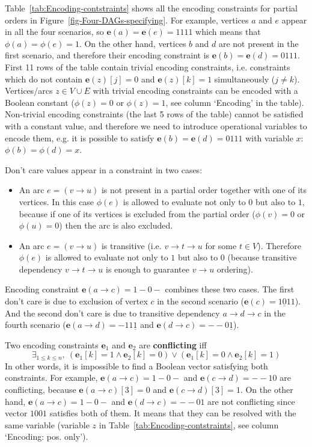 Table~\ref{tab:Encoding-contstraints} shows all the encoding constraints
for partial orders in Figure~\ref{fig-Four-DAGs-specifying}. For
example, vertices $a$ and $e$ appear in all the four scenarios,
so $\mathbf{e}(a)=\mathbf{e}(e)=1111$ which means that $\phi(a)=\phi(e)=1$.
On the other hand, vertices $b$ and $d$ are not present in the first
scenario, and therefore their encoding constraint is $\mathbf{e}(b)=\mathbf{e}(d)=0111$.
First 11 rows of the table contain trivial\emph{ }encoding\emph{ }constraints,
i.e. constraints which do not contain $\mathbf{e}(z)[j]=0$ and $\mathbf{e}(z)[k]=1$
simultaneously ($j\neq k$). Vertices/arcs $z\in V\cup E$ with trivial
encoding constraints can be encoded with a Boolean constant ($\phi(z)=0$
or $\phi(z)=1$, see column `Encoding' in the table). Non-trivial\emph{
}encoding\emph{ }constraints (the last 5 rows of the table) cannot
be satisfied with a constant value, and therefore we need to introduce
operational variables to encode them, e.g. it is possible to satisfy
$\mathbf{e}(b)=\mathbf{e}(d)=0111$ with variable $x$: $\phi(b)=\phi(d)=x$.

Don't care values appear in a constraint in two cases:
\begin{itemize}
\item An arc $e=(v\rightarrow u)$ is not present in a partial order together
with one of its vertices. In this case $\phi(e)$ is allowed to evaluate
not only to $0$ but also to $1$, because if one of its vertices
is excluded from the partial order ($\phi(v)=0$ or $\phi(u)=0$)
then the arc is also excluded.
\item An arc $e=(v\rightarrow u)$ is transitive (i.e. $v\rightarrow t\rightarrow u$
for some $t\in V$). Therefore $\phi(e)$ is allowed to evaluate not
only to $1$ but also to $0$ (because transitive dependency $v\rightarrow t\rightarrow u$
is enough to guarantee $v\rightarrow u$ ordering).
\end{itemize}
Encoding constraint $\mathbf{e}(a\rightarrow c)=1\!-\!0-$ combines
these two cases. The first don't care is due to exclusion of vertex
$c$ in the second scenario ($\mathbf{e}(c)=1\underline{0}11$). And
the second don't care is due to transitive dependency $a\rightarrow d\rightarrow c$
in the fourth scenario ($\mathbf{e}(a\rightarrow d)=-11\underline{1}$
and $\mathbf{e}(d\rightarrow c)=-\!-0\underline{1}$).

Two encoding constraints $\mathbf{e}_{1}$ and $\mathbf{e}_{2}$ are
\textbf{conflicting} iff
\[
\exists_{1\le k\le n},\ (\mathbf{e}_{1}[k]=1\wedge\mathbf{e}_{2}[k]=0)\vee(\mathbf{e}_{1}[k]=0\wedge\mathbf{e}_{2}[k]=1)
\]
In other words, it is impossible to find a Boolean vector satisfying
both constraints. For example, $\mathbf{e}(a\rightarrow c)=1\!-\!0-$
and $\mathbf{e}(c\rightarrow d)=-\!-\!10$ are conflicting, because
$\mathbf{e}(a\rightarrow c)[3]=0$ and $\mathbf{e}(c\rightarrow d)[3]=1$.
On the other hand, $\mathbf{e}(a\rightarrow c)=1\!-\!0-$ and $\mathbf{e}(d\rightarrow c)=-\!-\!01$
are not conflicting since vector $1001$ satisfies both of them. It
means that they can be resolved with the same variable (variable $z$
in Table~\ref{tab:Encoding-contstraints}, see column `Encoding:
pos. only').

